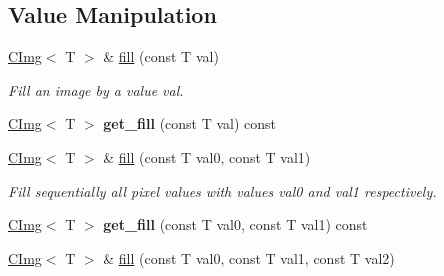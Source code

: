 \subsection*{Value Manipulation}
\label{_amgrp48378a084b0cdc352fe179ec02061ed8}
 \begin{DoxyCompactItemize}
\item 
\hyperlink{structcimg__library_1_1CImg}{CImg}$<$ T $>$ \& \hyperlink{structcimg__library_1_1CImg_a494a1e1424510af07e705dfe9b5f78bd}{fill} (const T val)
\begin{DoxyCompactList}\small\item\em Fill an image by a value {\ttfamily val}. \item\end{DoxyCompactList}\item 
\hypertarget{structcimg__library_1_1CImg_a07b87161f045a75bb879ce59883f545d}{
\hyperlink{structcimg__library_1_1CImg}{CImg}$<$ T $>$ {\bfseries get\_\-fill} (const T val) const }
\label{structcimg__library_1_1CImg_a07b87161f045a75bb879ce59883f545d}

\item 
\hypertarget{structcimg__library_1_1CImg_a1017563288be5d5ff23f70a91ef519df}{
\hyperlink{structcimg__library_1_1CImg}{CImg}$<$ T $>$ \& \hyperlink{structcimg__library_1_1CImg_a1017563288be5d5ff23f70a91ef519df}{fill} (const T val0, const T val1)}
\label{structcimg__library_1_1CImg_a1017563288be5d5ff23f70a91ef519df}

\begin{DoxyCompactList}\small\item\em Fill sequentially all pixel values with values {\itshape val0\/} and {\itshape val1\/} respectively. \item\end{DoxyCompactList}\item 
\hypertarget{structcimg__library_1_1CImg_a024f8e61837ce84d76e84cbf1f1ad385}{
\hyperlink{structcimg__library_1_1CImg}{CImg}$<$ T $>$ {\bfseries get\_\-fill} (const T val0, const T val1) const }
\label{structcimg__library_1_1CImg_a024f8e61837ce84d76e84cbf1f1ad385}

\item 
\hypertarget{structcimg__library_1_1CImg_a851853ede03c4fbd99347777a0250b5a}{
\hyperlink{structcimg__library_1_1CImg}{CImg}$<$ T $>$ \& \hyperlink{structcimg__library_1_1CImg_a851853ede03c4fbd99347777a0250b5a}{fill} (const T val0, const T val1, const T val2)}
\label{structcimg__library_1_1CImg_a851853ede03c4fbd99347777a0250b5a}


\end{DoxyCompactItemize}
